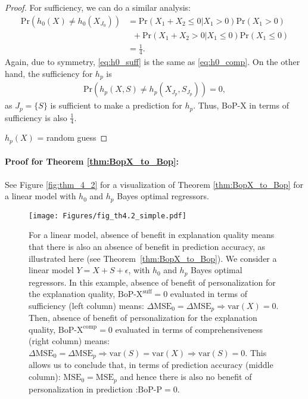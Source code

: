 \begin{proof}
    For sufficiency, we can do a similar analysis: 
    \begin{align}
        \text{Pr}(h_0(X) \neq h_0(X_{J_0}) ) &= \text{Pr}(X_1 + X_2 \leq 0 | X_1 > 0) \text{Pr}(X_1 > 0) \nonumber \\
        & \;\; + \text{Pr}(X_1 + X_2 > 0 | X_1 \leq 0) \text{Pr}(X_1\leq 0) \label{eq:h0_suff} \\
        &= \frac{1}{4}. \nonumber
    \end{align}
    Again, due to symmetry, \eqref{eq:h0_suff} is the same as \eqref{eq:h0_comp}. On the other hand, the sufficiency for $h_p$ is 
    \begin{align*}
        \text{Pr}(h_p(X,S) \neq h_p(X_{J_p}, S_{J_p})) = 0, 
    \end{align*}
    as $J_p = \{ S \}$ is sufficient to make a prediction for $h_p$. Thus, BoP-X in terms of sufficiency is also $\frac{1}{4}$. 

$h_p(X)$ = random guess
    
\end{proof}

\paragraph{Proof for Theorem \ref{thm:BopX_to_Bop}:}

See Figure \ref{fig:thm_4_2} for a visualization of Theorem \ref{thm:BopX_to_Bop} for a linear model with $h_0$ and $h_p$ Bayes optimal regressors.

\begin{figure*}\label{fig:thm_4_2}
    \centering
    \texttt{[image: Figures/fig\_th4.2\_simple.pdf]}
    \vspace{-1.5em}
    \caption{For a linear model, absence of benefit in explanation quality means that there is also an absence of benefit in prediction accuracy, as illustrated here (see Theorem~\ref{thm:BopX_to_Bop}). We consider a linear model $Y = X + S + \epsilon$, with $h_0$ and $h_p$ Bayes optimal regressors. In this example, absence of benefit of personalization for the explanation quality, $\text{BoP-X}^{\text{suff}}=0$ evaluated in terms of sufficiency (left column) means: $\Delta \text{MSE}_0 = \Delta \text{MSE}_p \Rightarrow \text{var}(X) =0$. Then, absence of benefit of personalization for the explanation quality, $\text{BoP-X}^{\text{comp}}=0$ evaluated in terms of comprehensiveness (right column) means: $\Delta \text{MSE}_0 = \Delta \text{MSE}_p \Rightarrow \text{var}(S) = \text{var}(X) \Rightarrow \text{var}(S) =0$. This allows us to conclude that, in terms of prediction accuracy (middle column): $\text{MSE}_0 = \text{MSE}_p$ and hence there is also no benefit of personalization in prediction :$\text{BoP-P}=0$.}
    \label{fig:proof_fig2}
    \vspace{-1em}
\end{figure*}

